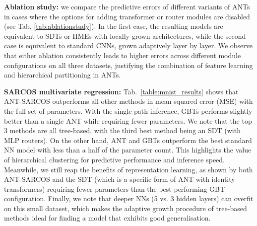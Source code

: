 \textbf{Ablation study:} we compare the predictive errors of different variants of ANTs in cases where the options for adding transformer or router modules are disabled (see Tab. \ref{tab:ablationstudy}). In the first case, the resulting models are equivalent to SDTs \cite{suarez1999globally} or HMEs \cite{jordan1994hierarchical} with locally grown architectures, while the second case is equivalent to standard CNNs, grown adaptively layer by layer. We observe that either ablation consistently leads to higher errors across different module configurations on all three datasets, justifying the combination of feature learning and hierarchical partitioning in ANTs.

\textbf{SARCOS multivariate regression:} Tab.~\ref{table:mnist_results} shows that ANT-SARCOS outperforms all other methods in mean squared error (MSE) with the full set of parameters. With the single-path inference, GBTs performs slightly better than a single ANT while requiring fewer parameters. We note that the top 3 methods are all tree-based, with the third best method being an SDT (with MLP routers). On the other hand, ANT and GBTs outperform the best standard NN model with less than a half of the parameter count. This highlights the value of hierarchical clustering for predictive performance and inference speed. Meanwhile, we still reap the benefits of representation learning, as shown by both ANT-SARCOS and the SDT (which is a specific form of ANT with identity transformers) requiring fewer parameters than the best-performing GBT configuration. Finally, we note that deeper NNs (5 vs. 3 hidden layers) can overfit on this small dataset, which makes the adaptive growth procedure of tree-based methods ideal for finding a model that exhibits good generalisation. 



